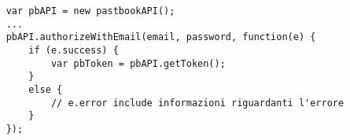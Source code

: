 \begin{lstlisting}
	var pbAPI = new pastbookAPI();
	...
	pbAPI.authorizeWithEmail(email, password, function(e) {
		if (e.success) {
			var pbToken = pbAPI.getToken();
		}
		else {
			// e.error include informazioni riguardanti l'errore
		}
	});
\end{lstlisting}
